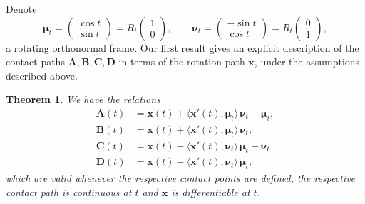 \documentclass[11pt]{article}
\newtheorem{thm}{Theorem}
\newcommand{\rotmat}[1]{R_{#1}}
\newcommand{\nvecone}{\boldsymbol{\mu}}
\newcommand{\nvectwo}{\boldsymbol{\nu}}
\begin{document}
Denote
$$
\nvecone_t = \begin{pmatrix}\cos t\\\sin t\end{pmatrix} = \rotmat{t} \begin{pmatrix}1\\0\end{pmatrix},
\qquad
\nvectwo_t = 
\begin{pmatrix}-\sin t\\\cos t\end{pmatrix} = \rotmat{t} \begin{pmatrix}0\\1\end{pmatrix},
$$
a rotating orthonormal frame.
Our first result gives an explicit description of the contact paths $\mathbf{A}, \mathbf{B}, \mathbf{C}, \mathbf{D}$ in terms of the rotation path $\mathbf{x}$, under the assumptions described above.


\begin{thm} 
\label{thm:contact-paths}
We have the relations
\begin{align}
\mathbf{A}(t) &= \mathbf{x}(t) + \Big\langle \mathbf{x}'(t),\nvecone_t \Big\rangle \,\nvectwo_t + \nvecone_t, 
\label{eq:contact-pathA} \\[3pt]
\mathbf{B}(t) &= \mathbf{x}(t) + \Big\langle \mathbf{x}'(t), \nvecone_t \Big\rangle \, \nvectwo_t,
\label{eq:contact-pathB} \\[3pt]
\mathbf{C}(t) &= \mathbf{x}(t) - \Big\langle \mathbf{x}'(t), \nvectwo_t \Big\rangle \, \nvecone_t + \nvectwo_t 
\label{eq:contact-pathC} \\[3pt]
\mathbf{D}(t) &= \mathbf{x}(t) - \Big\langle \mathbf{x}'(t), \nvectwo_t \Big\rangle \, \nvecone_t,
\label{eq:contact-pathD}
\end{align}
which are valid whenever the respective contact points are defined, the respective contact path is continuous at $t$ and $\mathbf{x}$ is differentiable at $t$.
\end{thm}
\end{document}
